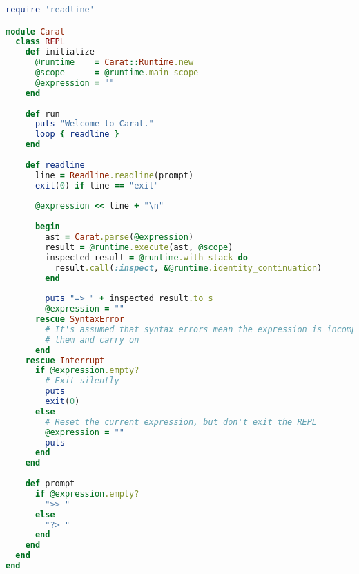 \begin{lstlisting}[title={\small\ttfamily\bfseries repl.rb},language=Ruby]
require 'readline'

module Carat
  class REPL
    def initialize
      @runtime    = Carat::Runtime.new
      @scope      = @runtime.main_scope
      @expression = ""
    end
    
    def run
      puts "Welcome to Carat."
      loop { readline }
    end
    
    def readline
      line = Readline.readline(prompt)
      exit(0) if line == "exit"
      
      @expression << line + "\n"
      
      begin
        ast = Carat.parse(@expression)
        result = @runtime.execute(ast, @scope)
        inspected_result = @runtime.with_stack do
          result.call(:inspect, &@runtime.identity_continuation)
        end
        
        puts "=> " + inspected_result.to_s
        @expression = ""
      rescue SyntaxError
        # It's assumed that syntax errors mean the expression is incomplete, so we just rescue
        # them and carry on
      end
    rescue Interrupt
      if @expression.empty?
        # Exit silently
        puts
        exit(0)
      else
        # Reset the current expression, but don't exit the REPL
        @expression = ""
        puts
      end
    end
    
    def prompt
      if @expression.empty?
        ">> "
      else
        "?> "
      end
    end
  end
end

\end{lstlisting}
